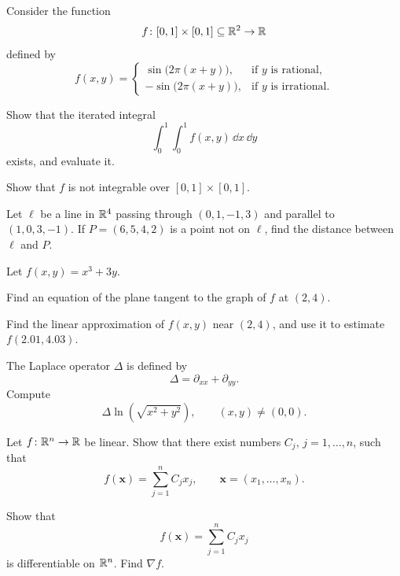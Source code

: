 \begin{problem}
Consider the function
\[
f\colon[0,1]\times[0,1]\subseteq\mathbb{R}^2\to\mathbb{R}
\]
defined by
\[
f(x,y)=
\begin{cases}
\sin\bigl(2\pi(x+y)\bigr), & \text{if $y$ is rational},\\
-\sin\bigl(2\pi(x+y)\bigr), & \text{if $y$ is irrational}.
\end{cases}
\]
\begin{problemsubparts}
\item Show that the iterated integral
\[
\int_0^1\int_0^1 f(x,y)\,\dd x\,\dd y
\]
exists, and evaluate it.
\item Show that $f$ is not integrable over $[0,1]\times[0,1]$.
\end{problemsubparts}
\end{problem}

\begin{problem}
Let $\ell$ be a line in $\mathbb{R}^4$ passing through $(0,1,-1,3)$ and parallel to $(1,0,3,-1)$. If $P=(6,5,4,2)$ is a point not on $\ell$, find the distance between $\ell$ and $P$.
\end{problem}

\begin{problem}
Let $f(x,y)=x^3+3y$.
\begin{problemsubparts}
\item Find an equation of the plane tangent to the graph of $f$ at $(2,4)$.
\item Find the linear approximation of $f(x,y)$ near $(2,4)$, and use it to estimate $f(2.01,4.03)$.
\end{problemsubparts}
\end{problem}

\begin{problem}
The Laplace operator $\Delta$ is defined by
\[
\Delta=\partial_{xx}+\partial_{yy}.
\]
Compute
\[
\Delta\ln\!\left(\sqrt{x^2+y^2}\right),
\qquad (x,y)\ne(0,0).
\]
\end{problem}

\begin{problem}
\begin{problemsubparts}
\item Let $f\colon\mathbb{R}^n\to\mathbb{R}$ be linear. Show that there exist numbers $C_j$, $j=1,\ldots,n$, such that
\[
f(\mathbf x)=\sum_{j=1}^n C_jx_j,
\qquad \mathbf x=(x_1,\ldots,x_n).
\]
\item Show that
\[
f(\mathbf x)=\sum_{j=1}^n C_jx_j
\]
is differentiable on $\mathbb{R}^n$. Find $\nabla f$.
\end{problemsubparts}
\end{problem}

